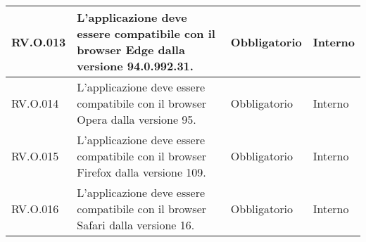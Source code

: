 \begin{longtable}{|C{2.7cm}|L{7.2cm}|C{2.7cm}|C{2cm}|}
        \hline
        RV.O.013 & L’applicazione deve essere compatibile con il browser Edge dalla versione 94.0.992.31.
         & Obbligatorio & Interno \\
        \hline
        RV.O.014 & L’applicazione deve essere compatibile con il browser Opera dalla
        versione 95.
         & Obbligatorio & Interno \\
        \hline
        RV.O.015 & L’applicazione deve essere compatibile con il browser Firefox dalla
versione 109.
         & Obbligatorio & Interno \\
        \hline
        RV.O.016 & L’applicazione deve essere compatibile con il browser Safari dalla
versione 16.
         & Obbligatorio & Interno \\
        \hline


        
        

\end{longtable}